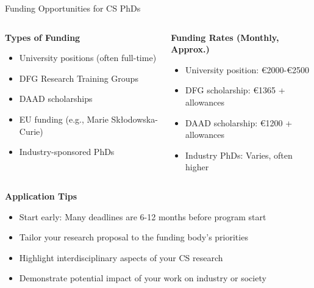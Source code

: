 \documentclass[aspectratio=169,10pt]{beamer}
\begin{document}
\begin{frame}{Funding Opportunities for CS PhDs}
    \begin{columns}[T]
        \begin{column}{0.5\textwidth}
            \textbf{Types of Funding}
            \begin{itemize}
                \item University positions (often full-time)
                \item DFG Research Training Groups
                \item DAAD scholarships
                \item EU funding (e.g., Marie Skłodowska-Curie)
                \item Industry-sponsored PhDs
            \end{itemize}
        \end{column}
        \begin{column}{0.5\textwidth}
            \textbf{Funding Rates (Monthly, Approx.)}
            \begin{itemize}
                \item University position: €2000-€2500
                \item DFG scholarship: €1365 + allowances
                \item DAAD scholarship: €1200 + allowances
                \item Industry PhDs: Varies, often higher
            \end{itemize}
        \end{column}
    \end{columns}
    
    \textbf{Application Tips}
    \begin{itemize}
        \item Start early: Many deadlines are 6-12 months before program start
        \item Tailor your research proposal to the funding body's priorities
        \item Highlight interdisciplinary aspects of your CS research
        \item Demonstrate potential impact of your work on industry or society
    \end{itemize}
\end{frame}
\end{document}
